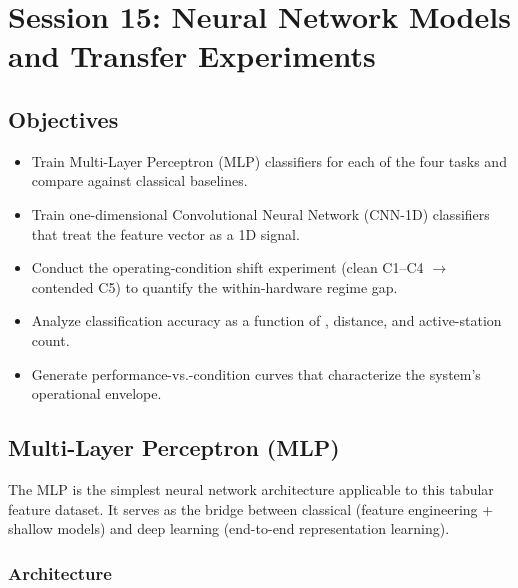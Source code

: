 \documentclass[11pt,letterpaper]{article}
\begin{document}
	\newpage
	\section{Session 15: Neural Network Models and Transfer Experiments}
	\label{sec:neural}

	\subsection{Objectives}

	\begin{itemize}[leftmargin=2em]
		\item Train Multi-Layer Perceptron (MLP) classifiers for each of the four tasks and compare against classical baselines.
		\item Train one-dimensional Convolutional Neural Network (CNN-1D) classifiers that treat the feature vector as a 1D signal.
		\item Conduct the operating-condition shift experiment (clean C1--C4 $\to$ contended C5) to quantify the within-hardware regime gap.
		\item Analyze classification accuracy as a function of \SNR{}, distance, and active-station count.
		\item Generate performance-vs.-condition curves that characterize the system's operational envelope.
	\end{itemize}

	\subsection{Multi-Layer Perceptron (MLP)}

	The MLP is the simplest neural network architecture applicable to this tabular feature dataset. It serves as the bridge between classical \ML{} (feature engineering + shallow models) and deep learning (end-to-end representation learning).

	\subsubsection{Architecture}
\end{document}
